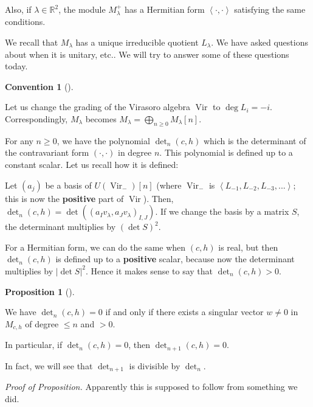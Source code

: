 \documentclass
[numbers=enddot,12pt,final,onecolumn,german,notitlepage]{scrartcl}%
\theoremstyle{definition}
\newtheorem{prop}[theo]{Proposition}
\newenvironment{proposition}[1][]
{\begin{prop}[#1]\begin{leftbar}}
{\end{leftbar}\end{prop}}
\newtheorem{conv}[theo]{Convention}
\newenvironment{Convention}[1][]
{\begin{conv}[#1]\begin{leftbar}}
{\end{leftbar}\end{conv}}
\begin{document}
Also, if $\lambda\in\mathbb{R}^{2}$, the module $M_{\lambda}^{+}$ has a
Hermitian form $\left\langle \cdot,\cdot\right\rangle $ satisfying the same conditions.

We recall that $M_{\lambda}$ has a unique irreducible quotient $L_{\lambda}$.
We have asked questions about when it is unitary, etc.. We will try to answer
some of these questions today.

\begin{Convention}
Let us change the grading of the Virasoro algebra $\operatorname*{Vir}$ to
$\deg L_{i}=-i$. Correspondingly, $M_{\lambda}$ becomes $M_{\lambda}%
=\bigoplus\limits_{n\geq0}M_{\lambda}\left[  n\right]  $.
\end{Convention}

For any $n\geq0$, we have the polynomial $\det\nolimits_{n}\left(  c,h\right)
$ which is the determinant of the contravariant form $\left(  \cdot
,\cdot\right)  $ in degree $n$. This polynomial is defined up to a constant
scalar. Let us recall how it is defined:

Let $\left(  a_{j}\right)  $ be a basis of $U\left(  \operatorname*{Vir}%
\nolimits_{-}\right)  \left[  n\right]  $ (where $\operatorname*{Vir}%
\nolimits_{-}$ is $\left\langle L_{-1},L_{-2},L_{-3},...\right\rangle $; this
is now the \textbf{positive} part of $\operatorname*{Vir}$). Then,
$\det\nolimits_{n}\left(  c,h\right)  =\det\left(  \left(  a_{I}v_{\lambda
},a_{J}v_{\lambda}\right)  _{I,J}\right)  $. If we change the basis by a
matrix $S$, the determinant multiplies by $\left(  \det S\right)  ^{2}$.

For a Hermitian form, we can do the same when $\left(  c,h\right)  $ is real,
but then $\det\nolimits_{n}\left(  c,h\right)  $ is defined up to a
\textbf{positive} scalar, because now the determinant multiplies by
$\left\vert \det S\right\vert ^{2}$. Hence it makes sense to say that
$\det\nolimits_{n}\left(  c,h\right)  >0$.

\begin{proposition}
We have $\det\nolimits_{n}\left(  c,h\right)  =0$ if and only if there exists
a singular vector $w\neq0$ in $M_{c,h}$ of degree $\leq n$ and $>0$.

In particular, if $\det\nolimits_{n}\left(  c,h\right)  =0$, then
$\det\nolimits_{n+1}\left(  c,h\right)  =0$.
\end{proposition}

In fact, we will see that $\det\nolimits_{n+1}$ is divisible by $\det
\nolimits_{n}$.

\textit{Proof of Proposition.} Apparently this is supposed to follow from
something we did.
\end{document}
